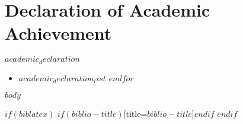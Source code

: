 \documentclass[
$if(fontsize)$
	$fontsize$,
$endif$
$if(lang)$
	$babel-lang$,
$endif$
$if(papersize)$
	$papersize$paper,
$endif$
$if(beamer)$
	ignorenonframetext,
$if(handout)$
	handout,
$endif$
$if(aspectratio)$
	aspectratio=$aspectratio$,
$endif$
$endif$
$for(classoption)$
	$classoption$$sep$,
$endfor$
]{$documentclass$}
\begin{document}
\chapter*{Declaration of Academic Achievement}
$academic_declaration$\newline

\begin{itemize}
$for(academic_declaration_list)$
	\item $academic_declaration_list$
$endfor$
\end{itemize}
\newpage

\hypersetup{pageanchor=true}
\pagestyle{fancy}
\fancyhf{}
\fancyhfoffset[L]{1cm} %
\fancyhfoffset[R]{1cm} %

\cfoot{\thepage}
\rfoot{}

$body$

\begin{appendix}
\end{appendix}


$if(biblatex)$
\printbibliography$if(biblio-title)$[title=$biblio-title$]$endif$
$endif$

\label{NumDocumentPages}
\end{document}

